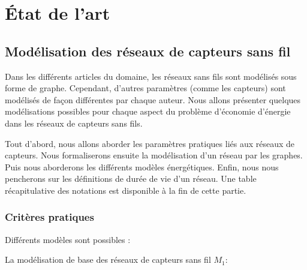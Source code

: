 
\chapter{État de l'art}\label{etat_art}

\section{Modélisation des réseaux de capteurs sans fil}
Dans les différents articles du domaine, les réseaux sans fils sont modélisés sous forme de graphe. Cependant, d'autres paramètres (comme les capteurs) sont modélisés de façon différentes par chaque auteur. Nous allons présenter quelques modélisations possibles pour chaque aspect du problème d'économie d'énergie dans les réseaux de capteurs sans fils.

Tout d'abord, nous allons aborder les paramètres pratiques liés aux réseaux de capteurs. Nous formaliserons ensuite la modélisation d'un réseau par les graphes. Puis nous aborderons les différents modèles énergétiques. Enfin, nous nous pencherons sur les définitions de durée de vie d'un réseau. Une table récapitulative des notations est disponible à la fin de cette partie.

\subsection{Critères pratiques}\label{modelePratique}


Différents modèles sont possibles :

La modélisation de base des réseaux de capteurs sans fil \textbf{$M_1$}:


